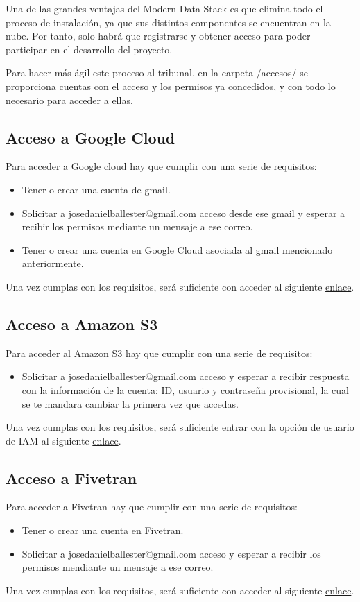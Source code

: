 Una de las grandes ventajas del Modern Data Stack es que elimina todo el proceso de instalación, ya que sus distintos componentes se encuentran en la nube. Por tanto, solo habrá que registrarse y obtener acceso para poder participar en el desarrollo del proyecto.

Para hacer más ágil este proceso al tribunal, en la carpeta /accesos/ se proporciona cuentas con el acceso y los permisos ya concedidos, y con todo lo necesario para acceder a ellas.

\subsection{Acceso a Google Cloud}
Para acceder a Google cloud hay que cumplir con una serie de requisitos:
\begin{itemize}
    \item Tener o crear una cuenta de gmail.
    \item Solicitar a josedanielballester@gmail.com acceso desde ese gmail y esperar a recibir los permisos mediante un mensaje a ese correo.
    \item Tener o crear una cuenta en Google Cloud asociada al gmail mencionado anteriormente.
\end{itemize}
Una vez cumplas con los requisitos, será suficiente con acceder al siguiente \href{https://console.cloud.google.com/home/dashboard?authuser=1&project=confident-trail-355019}{enlace}.

\subsection{Acceso a Amazon S3}
Para acceder al Amazon S3 hay que cumplir con una serie de requisitos:
\begin{itemize}
    \item Solicitar a josedanielballester@gmail.com acceso y esperar a recibir respuesta con la información de la cuenta: ID, usuario y contraseña provisional, la cual se te mandara cambiar la primera vez que accedas.
\end{itemize}
Una vez cumplas con los requisitos, será suficiente entrar con la opción de usuario de IAM al siguiente \href{https://s3.console.aws.amazon.com/s3/buckets/covidmoderndatastack?region=eu-west-3&tab=objects#}{enlace}.
\subsection{Acceso a Fivetran}
Para acceder a Fivetran hay que cumplir con una serie de requisitos:
\begin{itemize}
    \item Tener o crear una cuenta en Fivetran.
    \item Solicitar a josedanielballester@gmail.com acceso y esperar a recibir los permisos mendiante un mensaje a ese correo.
\end{itemize}
Una vez cumplas con los requisitos, será suficiente con acceder al siguiente \href{https://fivetran.com/account}{enlace}.
